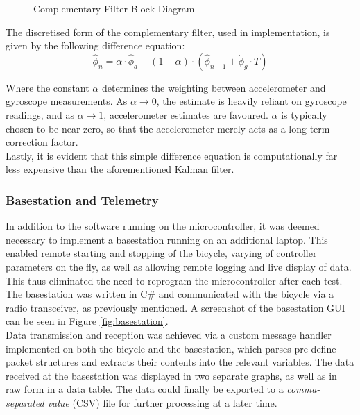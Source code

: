 \begin{figure}[H]
	\centering
    \def\svgwidth{0.75\textwidth}
    
    \caption{Complementary Filter Block Diagram}
	\label{fig:CF}
\end{figure}

The discretised form of the complementary filter, used in implementation, is given by the following difference equation:
\begin{equation*}
\hat{\phi}_n = \alpha \cdot \hat{\phi}_a + (1 - \alpha) \cdot (\hat{\phi}_{n-1} + \dot{\phi}_g \cdot T)
\end{equation*}

Where the constant $\alpha$ determines the weighting between accelerometer and gyroscope measurements. As $\alpha \rightarrow 0$, the estimate is heavily reliant on gyroscope readings, and as $\alpha \rightarrow 1$, accelerometer estimates are favoured. $\alpha$ is typically chosen to be near-zero, so that the accelerometer merely acts as a long-term correction factor. \\

Lastly, it is evident that this simple difference equation is computationally far less expensive than the aforementioned Kalman filter.

\subsubsection{Basestation and Telemetry} \label{basestationsec}
In addition to the software running on the microcontroller, it was deemed necessary to implement a basestation running on an additional laptop. This enabled remote starting and stopping of the bicycle, varying of controller parameters on the fly, as well as allowing remote logging and live display of data. This thus eliminated the need to reprogram the microcontroller after each test. The basestation was written in C\# and communicated with the bicycle via a radio transceiver, as previously mentioned. A screenshot of the basestation GUI can be seen in Figure \ref{fig:basestation}. \\

Data transmission and reception was achieved via a custom message handler implemented on both the bicycle and the basestation, which parses pre-define packet structures and extracts their contents into the relevant variables. The data received at the basestation was displayed in two separate graphs, as well as in raw form in a data table. The data could finally be exported to a \textit{comma-separated value} (CSV) file for further processing at a later time. \\

